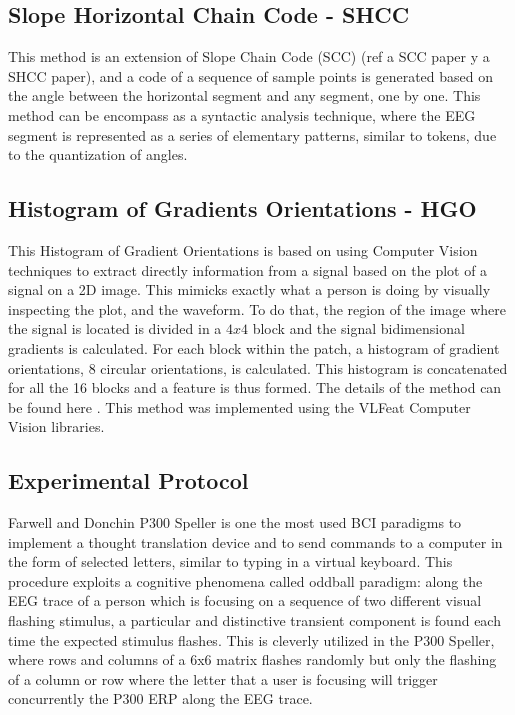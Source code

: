 \documentclass[sensors,article,submit,moreauthors,pdftex,10pt,a4paper]{mdpi}
\begin{document}
\subsection{Slope Horizontal Chain Code - SHCC}

This method is an extension of Slope Chain Code (SCC) (ref a SCC paper y a SHCC paper), and a code of a sequence of sample points is generated based on the angle between the horizontal segment and any segment, one by one.  This method can be encompass as a syntactic analysis technique, where the EEG segment is represented as a series of elementary patterns, similar to tokens, due to the quantization of angles.

\subsection{Histogram of Gradients Orientations - HGO}

This Histogram of Gradient Orientations is based on using Computer Vision techniques to extract directly information from a signal based on the plot of a signal on a 2D image.  This mimicks exactly what a person is doing by visually inspecting the plot, and the waveform.  To do that, the region of the image where the signal is located is divided in a $4 x 4$ block and the signal bidimensional gradients is calculated.  For each block within the patch, a histogram of gradient orientations, 8 circular orientations, is calculated.  This histogram is concatenated for all the 16 blocks and a feature is thus formed.  The details of the method can be found here \citep{Ramele2016}.  This method was implemented using the VLFeat  \citep{Vedaldi2010} Computer Vision libraries.



\subsection{Experimental Protocol}

Farwell and Donchin P300 Speller \citep{Farwell1988} is one the most used BCI paradigms to implement a thought translation device and to send commands to a computer in the form of selected letters, similar to typing in a virtual keyboard.  This procedure exploits a cognitive phenomena called oddball paradigm: along the EEG trace of a person which is focusing on a sequence of two different visual flashing stimulus, a particular and distinctive transient component is found each time the expected stimulus flashes.  This is cleverly utilized in the P300 Speller, where rows and columns of a 6x6 matrix flashes randomly but only the flashing of a column or row where the letter that a user is focusing will trigger concurrently the P300 ERP along the EEG trace.
\end{document}
